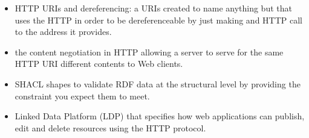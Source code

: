 \begin{itemize}
\item
  HTTP URIs and dereferencing: a URIs created to name anything but that
  uses the HTTP in order to be dereferenceable by just making and HTTP
  call to the address it provides.
\item
  the content negotiation in HTTP allowing a server to serve for the
  same HTTP URI different contents to Web clients.
\item
  SHACL shapes to validate RDF data at the structural level by providing
  the constraint you expect them to meet.
\item
  Linked Data Platform (LDP) that specifies how web applications can
  publish, edit and delete resources using the HTTP protocol.
\end{itemize}

